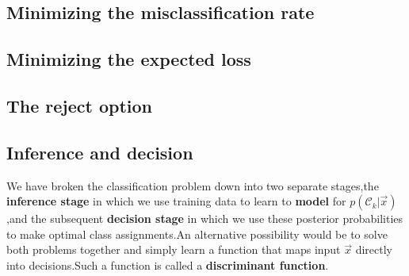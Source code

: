 \subsection{Minimizing the misclassification rate}
\subsection{Minimizing the expected loss}
\subsection{The reject option}
\subsection{Inference and decision}
We have broken the classification problem down into two separate stages,the \textbf{inference stage} in which we use training data to learn to \textbf{model} for $p(\mathcal{C}_k|\vec{x})$,and the subsequent \textbf{decision stage} in which we use these posterior probabilities to make optimal class assignments.An alternative  possibility would be to solve both problems together and simply learn a function that maps input $\vec{x}$ directly into decisions.Such a function is called a \textbf{discriminant function}.

